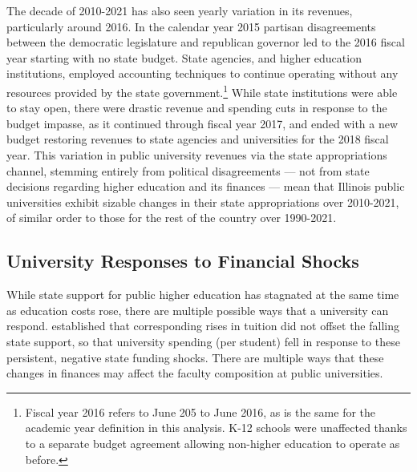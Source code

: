 \documentclass[notitlepage,12pt]{article}
\begin{document}
The decade of 2010-2021 has also seen yearly variation in its revenues, particularly around 2016.
In the calendar year 2015 partisan disagreements between the democratic legislature and republican governor led to the 2016 fiscal year starting with no state budget.
State agencies, and higher education institutions, employed accounting techniques to continue operating without any resources provided by the state government.\footnote{
    Fiscal year 2016 refers to June 205 to June 2016, as is the same for the academic year definition in this analysis. 
    K-12 schools were unaffected thanks to a separate budget agreement allowing non-higher education to operate as before.
}
While state institutions were able to stay open, there were drastic revenue and spending cuts in response to the budget impasse, as it continued through fiscal year 2017, and ended with a new budget restoring revenues to state agencies and universities for the 2018 fiscal year.
This variation in public university revenues via the state appropriations channel, stemming entirely from political disagreements --- not from state decisions regarding higher education and its finances \citep{young2020squandered} --- mean that Illinois public universities exhibit sizable changes in their state appropriations over 2010-2021, of similar order to those for the rest of the country over 1990-2021.


\subsection{University Responses to Financial Shocks}
\label{sec:responses}

While state support for public higher education has stagnated at the same time as education costs rose, there are multiple possible ways that a university can respond.
\cite{NBERw23736} established that corresponding rises in tuition did not offset the falling state support, so that university spending (per student) fell in response to these persistent, negative state funding shocks.
There are multiple ways that these changes in finances may affect the faculty composition at public universities.
\end{document}
